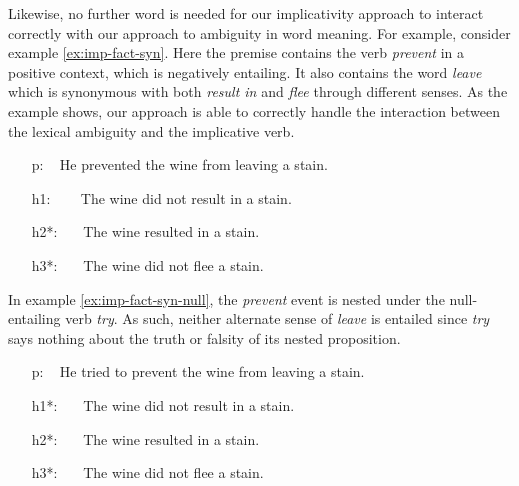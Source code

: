 Likewise, no further word is needed for our implicativity approach to interact
correctly with our approach to ambiguity in word meaning.  For example, consider
example \ref{ex:imp-fact-syn}.  Here the premise contains the verb {\it prevent}
in a positive context, which is negatively entailing.  It also contains the word
{\it leave} which is synonymous with both {\it result in} and {\it flee} through
different senses.  As the example shows, our approach is able to correctly
handle the interaction between the lexical ambiguity and the implicative verb.

\begin{covex}\label{ex:imp-fact-syn}
\begin{itemize} \itemsep -3pt
  \item[p:]~     He prevented the wine from leaving a stain.
  \item[h1:]~~~ The wine did not result in a stain.
  \item[h2*:]~~~The wine resulted in a stain.
  \item[h3*:]~~~The wine did not flee a stain.
\end{itemize}
\end{covex}

In example \ref{ex:imp-fact-syn-null}, the {\it prevent} event is nested under
the null-entailing verb {\it try}.  As such, neither alternate sense of {\it
leave} is entailed since {\it try} says nothing about the truth or falsity of
its nested proposition.

\begin{covex}\label{ex:imp-fact-syn-null}
\begin{itemize} \itemsep -3pt
  \item[p:]~     He tried to prevent the wine from leaving a stain.
  \item[h1*:]~~~The wine did not result in a stain.
  \item[h2*:]~~~The wine resulted in a stain.
  \item[h3*:]~~~The wine did not flee a stain.
\end{itemize}
\end{covex}
  

